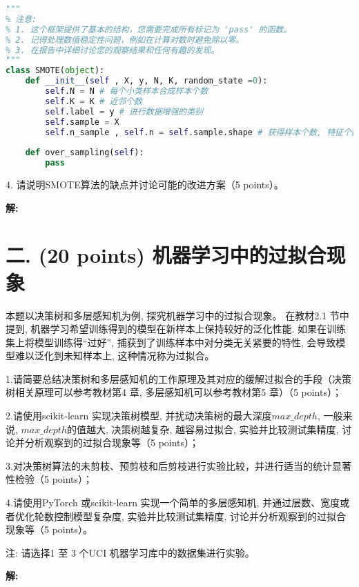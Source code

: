 \documentclass[8pt]{article}
\begin{document}
\begin{lstlisting}[breaklines=true, language=Python, caption=SMOTE模型接口]
"""
% 注意:
% 1. 这个框架提供了基本的结构，您需要完成所有标记为 'pass' 的函数。
% 2. 记得处理数值稳定性问题，例如在计算对数时避免除以零。
% 3. 在报告中详细讨论您的观察结果和任何有趣的发现。
"""
class SMOTE(object):
    def __init__(self , X, y, N, K, random_state =0):
        self.N = N # 每个小类样本合成样本个数
        self.K = K # 近邻个数
        self.label = y # 进行数据增强的类别
        self.sample = X
        self.n_sample , self.n = self.sample.shape # 获得样本个数, 特征个数
    
    def over_sampling(self):
        pass
\end{lstlisting}

4. 请说明SMOTE算法的缺点并讨论可能的改进方案（5 points）。

\textbf{\large 解:}

\vspace{3em}

\section*{二. (20 points) 机器学习中的过拟合现象}

本题以决策树和多层感知机为例, 探究机器学习中的过拟合现象。 在教材2.1 节中提到, 机器学习希望训练得到的模型在新样本上保持较好的泛化性能. 如果在训练集上将模型训练得“过好”, 捕获到了训练样本中对分类无关紧要的特性, 会导致模型难以泛化到未知样本上, 这种情况称为过拟合。

1.请简要总结决策树和多层感知机的工作原理及其对应的缓解过拟合的手段（决策树相关原理可以参考教材第4 章, 多层感知机可以参考教材第5 章）（5 points）；

2.请使用scikit-learn 实现决策树模型, 并扰动决策树的最大深度$max\_ depth$, 一般来说, $max\_ depth$的值越大, 决策树越复杂, 越容易过拟合, 实验并比较测试集精度, 讨论并分析观察到的过拟合现象等（5 points）；

3.对决策树算法的未剪枝、预剪枝和后剪枝进行实验比较，并进行适当的统计显著性检验（5 points）；

4.请使用PyTorch 或scikit-learn 实现一个简单的多层感知机, 并通过层数、宽度或者优化轮数控制模型复杂度, 实验并比较测试集精度, 讨论并分析观察到的过拟合现象等（5 points）。

注: 请选择1 至 3 个UCI 机器学习库中的数据集进行实验。

\textbf{\large 解:}

\vspace{3em}
\end{document}
